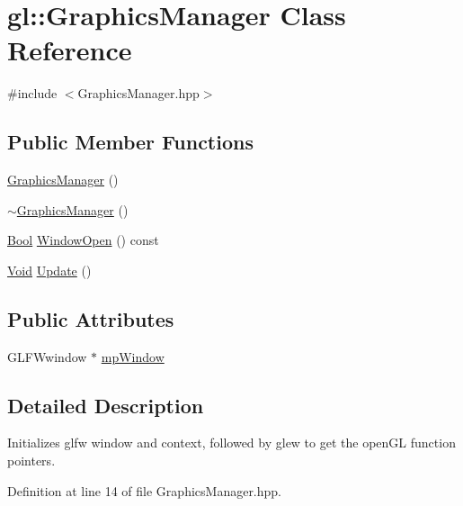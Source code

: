 \hypertarget{classgl_1_1_graphics_manager}{\section{gl\-:\-:Graphics\-Manager Class Reference}
\label{classgl_1_1_graphics_manager}
}


{\ttfamily \#include $<$Graphics\-Manager.\-hpp$>$}

\subsection*{Public Member Functions}
\begin{DoxyCompactItemize}
\item 
\hyperlink{classgl_1_1_graphics_manager_a3ac6586fec61361f71fc6874387e62cb}{Graphics\-Manager} ()
\item 
\hyperlink{classgl_1_1_graphics_manager_a918fd5f89641e57335af2cc584ef19dd}{$\sim$\-Graphics\-Manager} ()
\item 
\hyperlink{_basic_types_8hpp_a76a8b016e5ad61faf9062cc387df5016}{Bool} \hyperlink{classgl_1_1_graphics_manager_a26f6eb89ac3df56c7ef442f255bf1f2a}{Window\-Open} () const 
\item 
\hyperlink{_basic_types_8hpp_afdf0f22c576e6ee1b982f64b839c4bea}{Void} \hyperlink{classgl_1_1_graphics_manager_ac8d6fd33d451289b908f8e3643591c59}{Update} ()
\end{DoxyCompactItemize}
\subsection*{Public Attributes}
\begin{DoxyCompactItemize}
\item 
G\-L\-F\-Wwindow $\ast$ \hyperlink{classgl_1_1_graphics_manager_a52a5220a1ae3beeefbce6303df4edd73}{mp\-Window}
\end{DoxyCompactItemize}


\subsection{Detailed Description}
Initializes glfw window and context, followed by glew to get the open\-G\-L function pointers. 

Definition at line 14 of file Graphics\-Manager.\-hpp.



